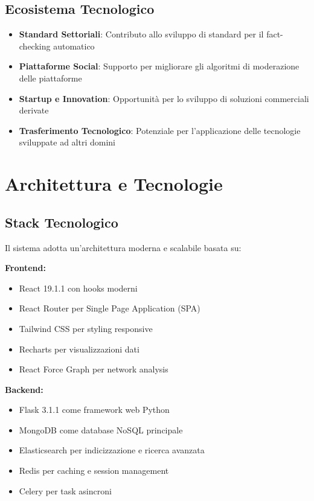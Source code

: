 \documentclass[12pt,a4paper]{report}
\begin{document}
\subsection{Ecosistema Tecnologico}

\begin{itemize}
    \item \textbf{Standard Settoriali}: Contributo allo sviluppo di standard per il fact-checking automatico
    \item \textbf{Piattaforme Social}: Supporto per migliorare gli algoritmi di moderazione delle piattaforme
    \item \textbf{Startup e Innovation}: Opportunità per lo sviluppo di soluzioni commerciali derivate
    \item \textbf{Trasferimento Tecnologico}: Potenziale per l'applicazione delle tecnologie sviluppate ad altri domini
\end{itemize}

\section{Architettura e Tecnologie}

\subsection{Stack Tecnologico}

Il sistema adotta un'architettura moderna e scalabile basata su:

\textbf{Frontend:}
\begin{itemize}
    \item React 19.1.1 con hooks moderni
    \item React Router per Single Page Application (SPA)
    \item Tailwind CSS per styling responsive
    \item Recharts per visualizzazioni dati
    \item React Force Graph per network analysis
\end{itemize}

\textbf{Backend:}
\begin{itemize}
    \item Flask 3.1.1 come framework web Python
    \item MongoDB come database NoSQL principale
    \item Elasticsearch per indicizzazione e ricerca avanzata
    \item Redis per caching e session management
    \item Celery per task asincroni
\end{itemize}
\end{document}
